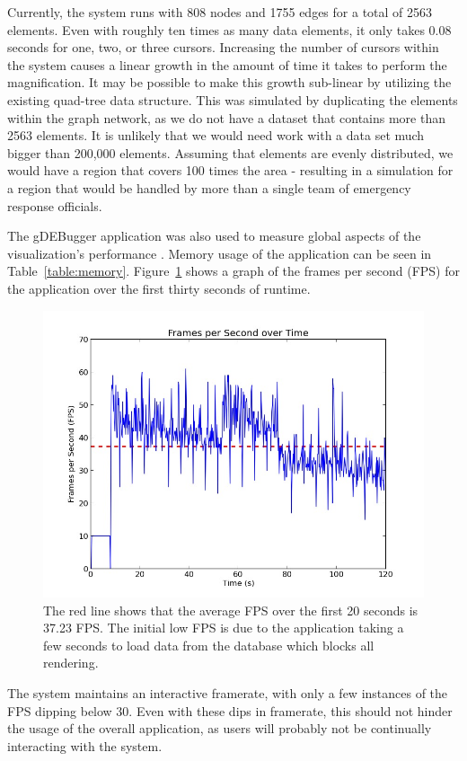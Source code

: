 Currently, the system runs with 808 nodes and 1755 edges for a total of 2563 elements. Even with roughly ten times as many data elements, it only takes 0.08 seconds for one, two, or three cursors. Increasing the number of cursors within the system causes a linear growth in the amount of time it takes to perform the magnification. It may be possible to make this growth sub-linear by utilizing the existing quad-tree data structure. This was simulated by duplicating the elements within the graph network, as we do not have a dataset that contains more than 2563 elements. It is unlikely
that we would need work with a data set much bigger than 200,000 elements. Assuming that elements are evenly distributed, we would have a region that covers 100 times the area - resulting in a simulation for a region that would be handled by more than a single team of emergency response officials.

The gDEBugger application was also used to measure global aspects of the visualization's performance \cite{gdebugger_website}. Memory usage of the application can be seen in Table~\ref{table:memory}. Figure~\ref{fig:fps_graph} shows a graph of the frames per second (FPS) for the application over the first thirty seconds of runtime.

\begin{figure}[htp] \centering
    \includegraphics[width=0.80\linewidth]{img/FPS_graph.jpg}
    \caption[Overall Application FPS]{The red line shows that the average FPS over the first 20 seconds is 37.23 FPS\@. The initial low FPS is due to the application taking a few seconds to load data from the database which blocks all rendering.}
    \label{fig:fps_graph}
\end{figure}

The system maintains an interactive framerate, with only a few instances of the FPS dipping below 30. Even with these dips in framerate, this should not hinder the usage of the overall application, as users will probably not be continually interacting with the system.

